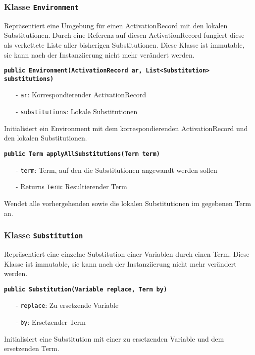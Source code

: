 \documentclass[parskip=full,11pt,twoside]{scrartcl}
\begin{document}
\subsubsection{Klasse \texttt{Environment}}
Repräsentiert eine Umgebung für einen ActivationRecord mit den lokalen Substitutionen. Durch eine Referenz auf diesen ActivationRecord fungiert diese als verkettete Liste aller bisherigen Substitutionen. Diese Klasse ist immutable, sie kann nach der Instanziierung nicht mehr verändert werden.

\textbf{\texttt{public Environment(ActivationRecord ar, List<Substitution>\\ substitutions)}}
\begin{itemize}[noitemsep]
	\item[-] \texttt{ar}: Korrespondierender ActivationRecord
	\item[-] \texttt{substitutions}: Lokale Substitutionen
\end{itemize}
Initialisiert ein Environment mit dem korrespondierenden ActivationRecord und den lokalen Substitutionen.

\textbf{\texttt{public Term applyAllSubstitutions(Term term)}}
\begin{itemize}[noitemsep]
	\item[-] \texttt{term}: Term, auf den die Substitutionen angewandt werden sollen
	\item[-] Returns \texttt{Term}: Resultierender Term
\end{itemize}
Wendet alle vorhergehenden sowie die lokalen Substitutionen im gegebenen Term an.

\subsubsection{Klasse \texttt{Substitution}}
Repräsentiert eine einzelne Substitution einer Variablen durch einen Term. Diese Klasse ist immutable, sie kann nach der Instanziierung nicht mehr verändert werden.

\textbf{\texttt{public Substitution(Variable replace, Term by)}}
\begin{itemize}[noitemsep]
	\item[-] \texttt{replace}: Zu ersetzende Variable
	\item[-] \texttt{by}: Ersetzender Term
\end{itemize}
Initialisiert eine Substitution mit einer zu ersetzenden Variable und dem ersetzenden Term.
\end{document}

